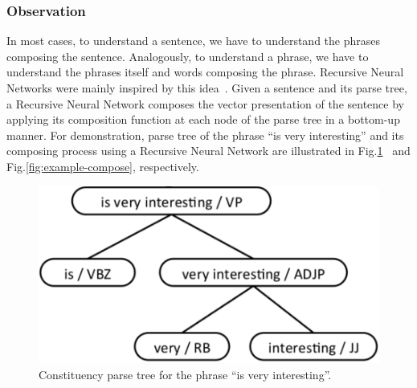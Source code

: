 \subsubsection{Observation}
In most cases, to understand a sentence, we have to understand the phrases composing the sentence.
Analogously, to understand a phrase, we have to understand the phrases itself and words composing the phrase.
Recursive Neural Networks were mainly inspired by this idea~\cite{treeLSTM}.
Given a sentence and its parse tree, a Recursive Neural Network composes the vector presentation of the sentence by applying its composition function at each node of the parse tree in a bottom-up manner.
For demonstration, parse tree of the phrase ``is very interesting'' and its composing process using a Recursive Neural Network are illustrated in Fig.\ref{fig:example-parse}~\cite{tag-embedding-rnn} and Fig.\ref{fig:example-compose}, respectively.


\begin{figure}[H]
    \centering
    \includegraphics[scale=0.5]{figure/example-parse}
    \caption[Constituency parse tree for the phrase ``is very interesting'']{Constituency parse tree for the phrase ``is very interesting''.}
    \label{fig:example-parse}
\end{figure}

